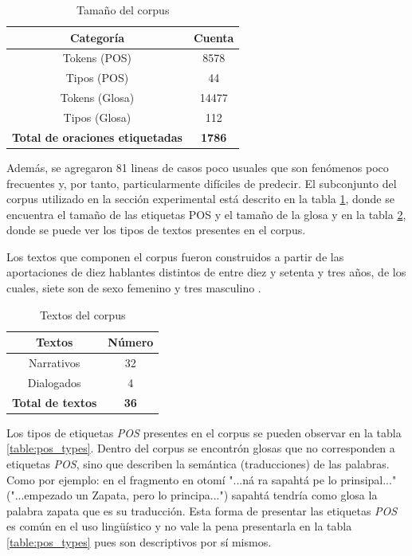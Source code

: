 \documentclass[letterpaper,12pt,oneside]{book}
\theoremstyle{definition}
\begin{document}

\begin{table}
	\centering
	\begin{tabular}{| c | c |}\hline
		\textbf{Categoría} & \textbf{Cuenta} \\ \hline
		Tokens (POS) & 8578\\
		Tipos (POS) & 44\\
		Tokens (Glosa) & 14477\\
		Tipos (Glosa) & 112\\
		\textbf{Total de oraciones etiquetadas} & \textbf{1786} \\ \hline
	\end{tabular}
	\caption{Tamaño del corpus}
	\label{table:corpus_length:1}
\end{table}

Además, se agregaron 81 lineas de casos poco usuales que son fenómenos poco frecuentes y, por tanto, particularmente difíciles de predecir. El subconjunto del corpus utilizado en la sección experimental está descrito en la tabla \ref{table:corpus_length:1}, donde se encuentra el tamaño de las etiquetas POS y el tamaño de la glosa y en la tabla \ref{table:corpus_text:1}, donde se puede ver los tipos de textos presentes en el corpus.

Los textos que componen el corpus fueron construidos a partir de las aportaciones de diez hablantes distintos de entre diez y setenta y tres años, de los cuales, siete son de sexo femenino y tres masculino \citep{lastra1992otomi}.

\begin{table}
	\centering
	\begin{tabular}{| c | c |}\hline
		\textbf{Textos} & \textbf{Número} \\ \hline
		Narrativos & 32 \\
		Dialogados & 4  \\
		\textbf{Total de textos}  & \textbf{36} \\\hline
	\end{tabular}
	\caption{Textos del corpus}
	\label{table:corpus_text:1}
\end{table}

Los tipos de etiquetas \textit{POS} presentes en el corpus se pueden observar en la tabla \ref{table:pos_types}. Dentro del corpus se encontrón glosas que no corresponden a etiquetas \textit{POS}, sino que describen la semántica (traducciones) de las palabras. Como por ejemplo: en el fragmento en otomí \textsf{"...ná ra sapahtá pe lo prinsipal..."} ("...empezado un Zapata, pero lo principa...") \textsf{sapahtá} tendría como glosa la palabra \textsf{zapata} que es su traducción. Esta forma de presentar las etiquetas \textit{POS} es común en el uso lingüístico y no vale la pena presentarla en la tabla \ref{table:pos_types} pues son descriptivos por sí mismos. 
\end{document}
